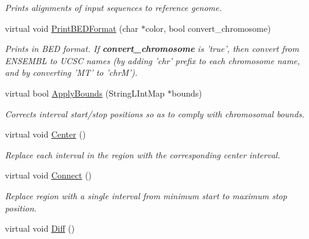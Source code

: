 \begin{CompactItemize}
\begin{CompactList}\small\item\em Prints alignments of input sequences to reference genome. \item\end{CompactList}\item 
\hypertarget{classGenomicRegion_405010d9256a3c08c53adee98133cb62}{
virtual void \hyperlink{classGenomicRegion_405010d9256a3c08c53adee98133cb62}{PrintBEDFormat} (char $\ast$color, bool convert\_\-chromosome)}
\label{classGenomicRegion_405010d9256a3c08c53adee98133cb62}

\begin{CompactList}\small\item\em Prints in BED format. If {\bf convert\_\-chromosome} is 'true', then convert from ENSEMBL to UCSC names (by adding 'chr' prefix to each chromosome name, and by converting 'MT' to 'chrM'). \item\end{CompactList}\item 
\hypertarget{classGenomicRegion_11b494e59775ac255ddb469c98f8a8a8}{
virtual bool \hyperlink{classGenomicRegion_11b494e59775ac255ddb469c98f8a8a8}{ApplyBounds} (StringLIntMap $\ast$bounds)}
\label{classGenomicRegion_11b494e59775ac255ddb469c98f8a8a8}

\begin{CompactList}\small\item\em Corrects interval start/stop positions so as to comply with chromosomal bounds. \item\end{CompactList}\item 
\hypertarget{classGenomicRegion_1e9a85a086afbe2608411450c9a4c5e6}{
virtual void \hyperlink{classGenomicRegion_1e9a85a086afbe2608411450c9a4c5e6}{Center} ()}
\label{classGenomicRegion_1e9a85a086afbe2608411450c9a4c5e6}

\begin{CompactList}\small\item\em Replace each interval in the region with the corresponding center interval. \item\end{CompactList}\item 
\hypertarget{classGenomicRegion_c2c426782bd7c0d302b7a77bb1ff047f}{
virtual void \hyperlink{classGenomicRegion_c2c426782bd7c0d302b7a77bb1ff047f}{Connect} ()}
\label{classGenomicRegion_c2c426782bd7c0d302b7a77bb1ff047f}

\begin{CompactList}\small\item\em Replace region with a single interval from minimum start to maximum stop position. \item\end{CompactList}\item 
\hypertarget{classGenomicRegion_869de97ecf059355fe5a5b572b5c2575}{
virtual void \hyperlink{classGenomicRegion_869de97ecf059355fe5a5b572b5c2575}{Diff} ()}
\label{classGenomicRegion_869de97ecf059355fe5a5b572b5c2575}


\end{CompactItemize}
